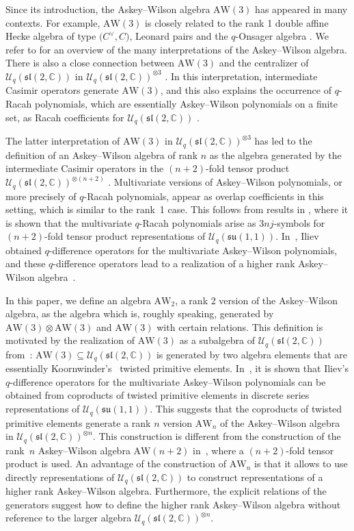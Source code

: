 \documentclass[pdftex]{sigma}
\numberwithin{equation}{section}
\newcommand{\CC}{\mathbb{C}}
\newcommand{\aw}{\mathrm{AW}\!\left(3\right)}
\newcommand{\AW}[1]{\mathrm{AW}_{#1}}
\newcommand{\slc}{\mathfrak{sl}(2,\CC)}
\newcommand{\Uq}{\mathcal{U}_q}
\begin{document}
Since its introduction, the Askey--Wilson algebra $\aw$ has appeared in many contexts. For example, $\aw$ is closely related to the rank 1 double affine Hecke algebra of type $\big(C^\vee,C\big)$, Leonard pairs and the $q$-Onsager algebra \cite{BVZ2017, Koornwinder2007, Koornwinder2008, Terwilliger2002, Terwilliger2013,Terwilliger2018}. We refer to \cite{CFGPRV2021} for an overview of the many interpretations of the Askey--Wilson algebra. There is also a close connection between $\aw$ and the centralizer of $\Uq(\slc)$ in $\Uq(\slc)^{\otimes3}$ \cite{CGVZ,GZ93,Huang2017}. In this interpretation, intermediate Casimir operators generate $\aw$, and this also explains the occurrence of $q$-Racah polynomials, which are essentially Askey--Wilson polynomials on a finite set, as Racah coefficients for $\Uq(\slc)$ \cite{Granovskii1993}.

The latter interpretation of $\aw$ in $\Uq(\slc)^{\otimes3}$ has led to the definition of an Askey--Wilson algebra of rank $n$ as the algebra generated by the intermediate Casimir operators in the $(n+2)$-fold tensor product $\Uq(\slc)^{\otimes(n+2)}$ \cite{CL, DeBie2021, DeBie2020, DeClercq19, Post2017}. Multivariate versions \cite{Gasper2005, Gasper2007} of Askey--Wilson polynomials, or more precisely of $q$-Racah polynomials, appear as overlap coefficients in this setting, which is similar to the rank~1 case. This follows from results in \cite{GIV}, where it is shown that the multivariate $q$-Racah polynomials arise as $3nj$-symbols for $(n+2)$-fold tensor product representations of $\Uq(\mathfrak{su}(1,1))$. In~\cite{Iliev2011}, Iliev obtained $q$-difference operators for the multivariate Askey--Wilson polynomials, and these $q$-difference operators lead to a realization of a higher rank Askey--Wilson algebra~\cite{DeBie2021}.

In this paper, we define an algebra $\AW{2}$, a rank 2 version of the Askey--Wilson algebra, as the algebra which is, roughly speaking, generated by $\aw\otimes\aw$ and $\aw$ with certain relations. This definition is motivated by the realization of $\aw$ as a subalgebra of $\Uq(\slc)$ from~\cite{Granovskii1993}: $\aw \subseteq \Uq(\slc)$ is generated by two algebra elements that are essentially Koornwinder's~\cite{Koornwinder1993} twisted primitive elements. In~\cite{Groenevelt2021}, it is shown that Iliev's $q$-difference operators for the multivariate Askey--Wilson polynomials can be obtained from coproducts of twisted primitive elements in discrete series representations of $\Uq(\mathfrak{su}(1,1))$. This suggests that the coproducts of twisted primitive elements generate a rank $n$ version $\AW{n}$ of the Askey--Wilson algebra in $\Uq(\slc)^{\otimes n}$. This construction is different from the construction of the rank~$n$ Askey--Wilson algebra $\mathrm{AW}(n+2)$ in~\cite{DeBie2020}, where a $(n+2)$-fold tensor product is used. An advantage of the construction of $\AW{n}$ is that it allows to use directly representations of $\Uq(\slc)$ to construct representations of a higher rank Askey--Wilson algebra. Furthermore, the explicit relations of the generators suggest how to define the higher rank Askey--Wilson algebra without reference to the larger algebra $\Uq(\slc)^{\otimes n}$.
\end{document}
